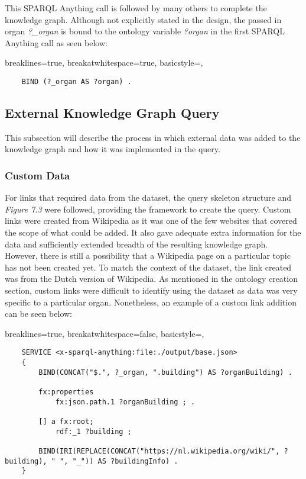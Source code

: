 This SPARQL Anything call is followed by many others to complete the knowledge graph. Although not explicitly stated in the design, the passed in organ \textit{?\_organ} is bound to the ontology variable \textit{?organ} in the first SPARQL Anything call as seen below:

\lstset
{
    breaklines=true,
    breakatwhitespace=true,
    basicstyle=\ttfamily,
}
\begin{lstlisting}
    BIND (?_organ AS ?organ) .
\end{lstlisting}

\subsection{External Knowledge Graph Query}
\hspace*{0.5cm} This subsection will describe the process in which external data was added to the knowledge graph and how it was implemented in the query. 

\subsubsection{Custom Data}
\hspace*{0.5cm} For links that required data from the dataset, the query skeleton structure and \textit{Figure 7.3} were followed, providing the framework to create the query. Custom links were created from Wikipedia as it was one of the few websites that covered the scope of what could be added. It also gave adequate extra information for the data and sufficiently extended breadth of the resulting knowledge graph. However, there is still a possibility that a Wikipedia page on a particular topic has not been created yet. To match the context of the dataset, the link created was from the Dutch version of Wikipedia. As mentioned in the ontology creation section, custom links were difficult to identify using the dataset as data was very specific to a particular organ. Nonetheless, an example of a custom link addition can be seen below:

\lstset
{
    breaklines=true,
    breakatwhitespace=false,
    basicstyle=\ttfamily,
}
\begin{lstlisting}
    SERVICE <x-sparql-anything:file:./output/base.json>
    {
        BIND(CONCAT("$.", ?_organ, ".building") AS ?organBuilding) .
    
        fx:properties
            fx:json.path.1 ?organBuilding ; .
    
        [] a fx:root; 
            rdf:_1 ?building ;
    
        BIND(IRI(REPLACE(CONCAT("https://nl.wikipedia.org/wiki/", ?building), " ", "_")) AS ?buildingInfo) . 
    } 
\end{lstlisting}

